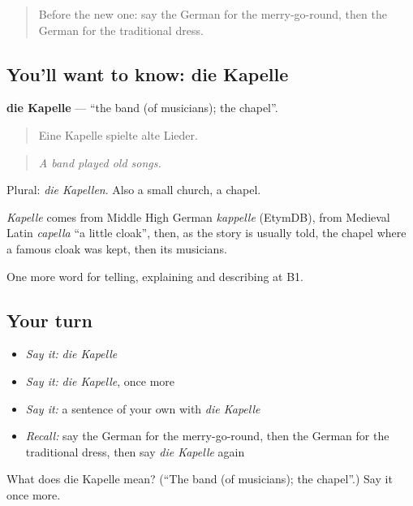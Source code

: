 \label{lesson:GE-C312-kapelle}



\begin{quote}
Before the new one: say the German for the merry-go-round, then the German for the traditional dress.
\end{quote}

\subsection*{You'll want to know: die Kapelle}
\textbf{die Kapelle} — \textquotedblleft{}the band (of musicians); the chapel\textquotedblright{}.

\begin{quote}
Eine Kapelle spielte alte Lieder.
\end{quote}

\begin{quote}
\emph{A band played old songs.}
\end{quote}

Plural: \emph{die Kapellen}. Also a small church, a chapel.

\begin{cousinweb}
\emph{Kapelle} comes from Middle High German \emph{kappelle} (EtymDB), from Medieval Latin \emph{capella} \textquotedblleft{}a little cloak\textquotedblright{}, then, as the story is usually told, the chapel where a famous cloak was kept, then its musicians.
\end{cousinweb}

\begin{grammarlens}[title={What you've built}]
One more word for telling, explaining and describing at B1.
\end{grammarlens}

\subsection*{Your turn}
\begin{itemize}
\raggedright
  \item \emph{Say it:} \emph{die Kapelle}
  \item \emph{Say it:} \emph{die Kapelle}, once more
  \item \emph{Say it:} a sentence of your own with \emph{die Kapelle}
  \item \emph{Recall:} say the German for the merry-go-round, then the German for the traditional dress, then say \emph{die Kapelle} again
\end{itemize}

\begin{tcolorbox}[breakable,colback=teal!4,colframe=teal!35!black,title={Before you move on}]
What does die Kapelle mean? (\textquotedblleft{}The band (of musicians); the chapel\textquotedblright{}.) Say it once more.
\end{tcolorbox}
